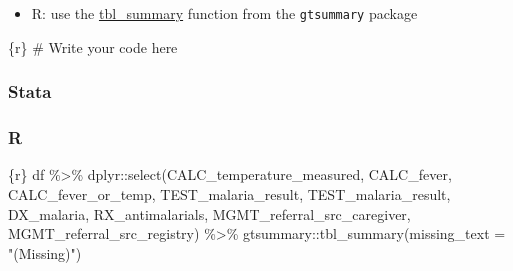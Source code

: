 \documentclass[
  letterpaper,
  DIV=11,
  numbers=noendperiod,
  oneside]{scrreprt}
\newenvironment{Shaded}{\begin{snugshade}}{\end{snugshade}}
\newcommand{\AttributeTok}[1]{\textcolor[rgb]{0.40,0.45,0.13}{#1}}
\newcommand{\CommentTok}[1]{\textcolor[rgb]{0.37,0.37,0.37}{#1}}
\newcommand{\FunctionTok}[1]{\textcolor[rgb]{0.28,0.35,0.67}{#1}}
\newcommand{\InformationTok}[1]{\textcolor[rgb]{0.37,0.37,0.37}{#1}}
\newcommand{\NormalTok}[1]{\textcolor[rgb]{0.00,0.23,0.31}{#1}}
\newcommand{\SpecialCharTok}[1]{\textcolor[rgb]{0.37,0.37,0.37}{#1}}
\newcommand{\StringTok}[1]{\textcolor[rgb]{0.13,0.47,0.30}{#1}}
\providecommand{\tightlist}{%
  \setlength{\itemsep}{0pt}\setlength{\parskip}{0pt}}\usepackage{longtable,booktabs,array}
\begin{document}
\begin{tcolorbox}[enhanced jigsaw, colbacktitle=quarto-callout-tip-color!10!white, titlerule=0mm, breakable, opacityback=0, opacitybacktitle=0.6, left=2mm, coltitle=black, colback=white, title=\textcolor{quarto-callout-tip-color}{\faLightbulb}\hspace{0.5em}{Tip}, rightrule=.15mm, colframe=quarto-callout-tip-color-frame, toprule=.15mm, bottomtitle=1mm, toptitle=1mm, arc=.35mm, bottomrule=.15mm, leftrule=.75mm]

\begin{itemize}
\tightlist
\item
  R: use the
  \href{https://www.danieldsjoberg.com/gtsummary/reference/tbl_summary.html}{tbl\_summary}
  function from the \texttt{gtsummary} package
\end{itemize}

\end{tcolorbox}

\begin{Shaded}
\begin{Highlighting}[]
\InformationTok{\textasciigrave{}\textasciigrave{}\textasciigrave{}\{r\}}
\CommentTok{\# Write your code here}
\InformationTok{\textasciigrave{}\textasciigrave{}\textasciigrave{}}
\end{Highlighting}
\end{Shaded}

\hypertarget{stata-10}{%
\subsubsection{Stata}\label{stata-10}}

\hypertarget{r-10}{%
\subsubsection{R}\label{r-10}}

\begin{Shaded}
\begin{Highlighting}[]
\InformationTok{\textasciigrave{}\textasciigrave{}\textasciigrave{}\{r\}}
\NormalTok{df }\SpecialCharTok{\%\textgreater{}\%}
\NormalTok{  dplyr}\SpecialCharTok{::}\FunctionTok{select}\NormalTok{(CALC\_temperature\_measured,}
\NormalTok{                CALC\_fever,}
\NormalTok{                CALC\_fever\_or\_temp,}
\NormalTok{                TEST\_malaria\_result,}
\NormalTok{                TEST\_malaria\_result,}
\NormalTok{                DX\_malaria,}
\NormalTok{                RX\_antimalarials,}
\NormalTok{                MGMT\_referral\_src\_caregiver,}
\NormalTok{                MGMT\_referral\_src\_registry) }\SpecialCharTok{\%\textgreater{}\%}
\NormalTok{  gtsummary}\SpecialCharTok{::}\FunctionTok{tbl\_summary}\NormalTok{(}\AttributeTok{missing\_text =} \StringTok{"(Missing)"}\NormalTok{)}
\InformationTok{\textasciigrave{}\textasciigrave{}\textasciigrave{}}
\end{Highlighting}
\end{Shaded}
\end{document}
